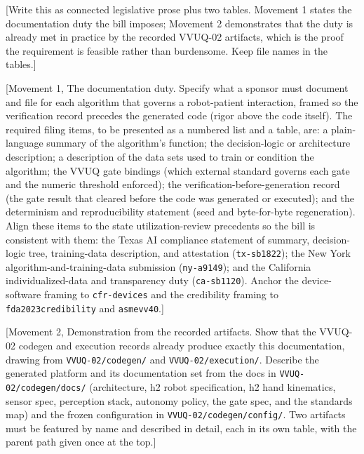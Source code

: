 
[Write this as connected legislative prose plus two tables. Movement 1 states the
documentation duty the bill imposes; Movement 2 demonstrates that the duty is
already met in practice by the recorded VVUQ-02 artifacts, which is the proof the
requirement is feasible rather than burdensome. Keep file names in the tables.]

[Movement 1, The documentation duty. Specify what a sponsor must document and file
for each algorithm that governs a robot-patient interaction, framed so the
verification record precedes the generated code (rigor above the code itself).
The required filing items, to be presented as a numbered list and a table, are: a
plain-language summary of the algorithm's function; the decision-logic or
architecture description; a description of the data sets used to train or
condition the algorithm; the VVUQ gate bindings (which external standard governs
each gate and the numeric threshold enforced); the verification-before-generation
record (the gate result that cleared before the code was generated or executed);
and the determinism and reproducibility statement (seed and byte-for-byte
regeneration). Align these items to the state utilization-review precedents so the
bill is consistent with them: the Texas AI compliance statement of summary,
decision-logic tree, training-data description, and attestation
(\texttt{tx-sb1822}); the New York algorithm-and-training-data submission
(\texttt{ny-a9149}); and the California individualized-data and transparency duty
(\texttt{ca-sb1120}). Anchor the device-software framing to \texttt{cfr-devices}
and the credibility framing to \texttt{fda2023credibility} and \texttt{asmevv40}.]

[Movement 2, Demonstration from the recorded artifacts. Show that the VVUQ-02
codegen and execution records already produce exactly this documentation, drawing
from \texttt{VVUQ-02/codegen/} and \texttt{VVUQ-02/execution/}. Describe the
generated platform and its documentation set from the docs in
\texttt{VVUQ-02/codegen/docs/} (architecture, h2 robot specification, h2 hand
kinematics, sensor spec, perception stack, autonomy policy, the gate spec, and the
standards map) and the frozen configuration in \texttt{VVUQ-02/codegen/config/}.
Two artifacts must be featured by name and described in detail, each in its own
table, with the parent path given once at the top.]

